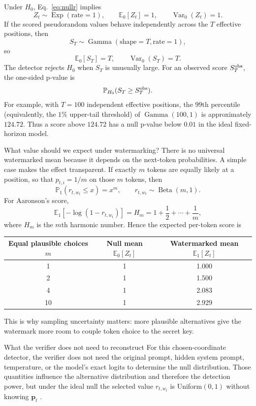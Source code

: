 \documentclass[11pt]{article}
\DeclareRobustCommand{\iperpaper}[2]{%
  \begingroup
  \hypersetup{pdfborder=0 0 0}%
  \href{iperpaper:#1}{{\color{iperpaperlink}#2}}%
  \endgroup
}
\def\iperpaper#1#2{#2}%
\newcommand{\Exp}{\operatorname{Exp}}
\newcommand{\Beta}{\operatorname{Beta}}
\newcommand{\Gam}{\operatorname{Gamma}}
\newcommand{\E}{\mathbb{E}}
\newcommand{\Pp}{\mathbb{P}}
\newcommand{\Var}{\operatorname{Var}}
\begin{document}
Under $H_0$, Eq.~\eqref{eq:nullr} implies
\[
  Z_t\sim\iperpaper{exp_symbol}{\Exp}(\text{rate}=1),
  \qquad
  \E_0[Z_t]=1,
  \qquad
  \Var_0(Z_t)=1.
\]
If the scored pseudorandom values behave independently across the $T$ effective positions, then
\begin{equation}
  \iperpaper{gamma_null}{S_T\sim\Gam(\text{shape}=T,\text{rate}=1)},
  \label{eq:gamma-main}
\end{equation}
so
\[
  \E_0[S_T]=T,\qquad \Var_0(S_T)=T.
\]
The detector rejects $H_0$ when $S_T$ is unusually large. For an observed score $S_T^{\rm obs}$, the \iperpaper{one_sided_p_value}{one-sided p-value} is
\[
  \Pp_{H_0}(S_T\ge S_T^{\rm obs}).
\]
For example, with $T=100$ independent effective positions, the $99$th percentile (equivalently, the $1\%$ upper-tail threshold) of $\iperpaper{gamma_percentile_example}{\Gam(100,1)}$ is approximately $124.72$.
Thus a score above $124.72$ has a null p-value below $0.01$ in the ideal fixed-horizon model.

\begin{leveltwo}{What value should we expect under watermarking?}
There is no universal watermarked mean because it depends on the next-token probabilities. A simple case makes the effect transparent. If exactly $m$ tokens are equally likely at a position, so that $p_{t,i}=1/m$ on those $m$ tokens, then
\[
  \Pp_1(r_{t,w_t}\le x)=x^m,
  \qquad
  \iperpaper{beta_equal_likelihood}{r_{t,w_t}\sim\Beta(m,1)}.
\]
For Aaronson's score,
\[
  \E_1[-\log(1-r_{t,w_t})]=H_m
  =1+\frac12+\cdots+\frac1m,
\]
where $H_m$ is the $m$th harmonic number. Hence the expected per-token score is
\begin{center}
\begin{tabular}{ccc}
\toprule
Equal plausible choices $m$ & Null mean $\E_0[Z_t]$ & Watermarked mean $\E_1[Z_t]$ \\
\midrule
1 & 1 & 1.000 \\
2 & 1 & 1.500 \\
4 & 1 & 2.083 \\
10 & 1 & 2.929 \\
\bottomrule
\end{tabular}
\end{center}
This is why sampling uncertainty matters: more plausible alternatives give the watermark more room to couple token choice to the secret key.

\end{leveltwo}


\begin{leveltwo}{What the verifier does not need to reconstruct}
For this chosen-coordinate detector, the verifier does not need the original prompt, hidden system prompt, temperature, or the model's exact logits to determine the null distribution. Those quantities influence the alternative distribution and therefore the detection power, but under the ideal null the selected value $r_{t,w_t}$ is \iperpaper{uniform_name}{Uniform}$(0,1)$ without knowing $\mathbf p_t$ \cite{li2025}.

\end{leveltwo}
\end{document}
